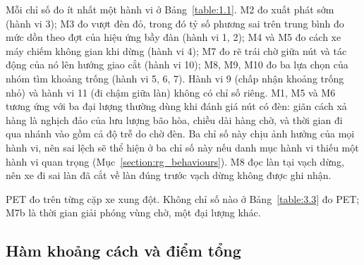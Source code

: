 \documentclass[../main.tex]{subfiles}
\begin{document}
Mỗi chỉ số đo ít nhất một hành vi ở Bảng~\ref{table:1.1}. M2 đo xuất phát sớm (hành vi 3); M3 đo vượt đèn đỏ, trong đó tỷ số phương sai trên trung bình đo mức dồn theo đợt của hiệu ứng bầy đàn (hành vi 1, 2); M4 và M5 đo cách xe máy chiếm không gian khi dừng (hành vi 4); M7 đo rẽ trái chờ giữa nút và tác động của nó lên hướng giao cắt (hành vi 10); M8, M9, M10 đo ba lựa chọn của nhóm tìm khoảng trống (hành vi 5, 6, 7). Hành vi 9 (chấp nhận khoảng trống nhỏ) và hành vi 11 (đi chậm giữa làn) không có chỉ số riêng. M1, M5 và M6 tương ứng với ba đại lượng thường dùng khi đánh giá nút có đèn: giãn cách xả hàng là nghịch đảo của lưu lượng bão hòa, chiều dài hàng chờ, và thời gian đi qua nhánh vào gồm cả độ trễ do chờ đèn. Ba chỉ số này chịu ảnh hưởng của mọi hành vi, nên sai lệch sẽ thể hiện ở ba chỉ số này nếu danh mục hành vi thiếu một hành vi quan trọng (Mục~\ref{section:rg_behaviours}). M8 đọc làn tại vạch dừng, nên xe đi sai làn đã cắt về làn đúng trước vạch dừng không được ghi nhận.

PET đo trên từng cặp xe xung đột. Không chỉ số nào ở Bảng~\ref{table:3.3} đo PET; M7b là thời gian giải phóng vùng chờ, một đại lượng khác.

\subsection{Hàm khoảng cách và điểm tổng}
\end{document}
